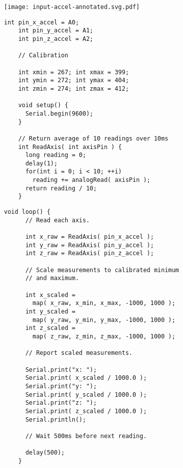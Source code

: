 \vspace{0.1in}
\begin{minipage}[t]{0.49\tw}

  \vspace{0.0in}
  \texttt{[image: input-accel-annotated.svg.pdf]}

  \vspace{0.0in}
  \begin{Verbatim}[gobble=3,fontsize=\small]
    int pin_x_accel = A0;
    int pin_y_accel = A1;
    int pin_z_accel = A2;

    // Calibration

    int xmin = 267; int xmax = 399;
    int ymin = 272; int ymax = 404;
    int zmin = 274; int zmax = 412;

    void setup() {
      Serial.begin(9600);
    }

    // Return average of 10 readings over 10ms
    int ReadAxis( int axisPin ) {
      long reading = 0;
      delay(1);
      for(int i = 0; i < 10; ++i)
        reading += analogRead( axisPin );
      return reading / 10;
    }
  \end{Verbatim}
\end{minipage}
\hfill
\begin{minipage}[t]{0.49\tw}
  \vspace{0.0in}
  \begin{Verbatim}[gobble=3,fontsize=\small]
    void loop() {
      // Read each axis.

      int x_raw = ReadAxis( pin_x_accel );
      int y_raw = ReadAxis( pin_y_accel );
      int z_raw = ReadAxis( pin_z_accel );

      // Scale measurements to calibrated minimum
      // and maximum.

      int x_scaled =
        map( x_raw, x_min, x_max, -1000, 1000 );
      int y_scaled =
        map( y_raw, y_min, y_max, -1000, 1000 );
      int z_scaled =
        map( z_raw, z_min, z_max, -1000, 1000 );

      // Report scaled measurements.

      Serial.print("x: ");
      Serial.print( x_scaled / 1000.0 );
      Serial.print("y: ");
      Serial.print( y_scaled / 1000.0 );
      Serial.print("z: ");
      Serial.print( z_scaled / 1000.0 );
      Serial.println();

      // Wait 500ms before next reading.

      delay(500);
    }
  \end{Verbatim}
\end{minipage}
\vspace{0.1in}

